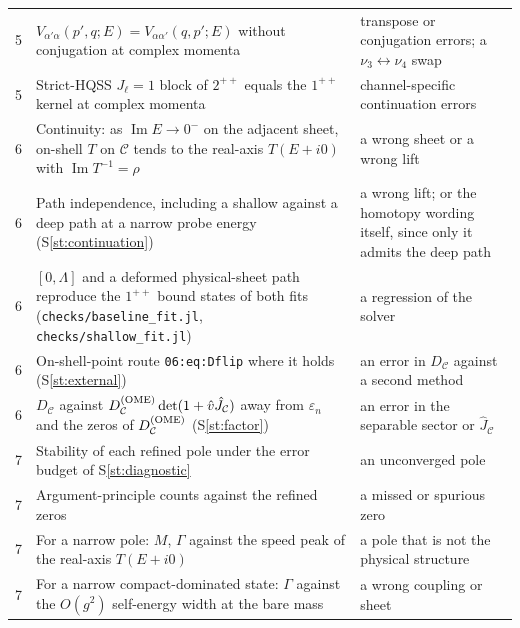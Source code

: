 \documentclass[11pt]{article}
\newcommand{\file}[1]{\nolinkurl{#1}}
\newcommand{\Sr}[1]{S\ref{#1}}
\begin{document}
\begin{xltabular}{\textwidth}{@{}lLL@{}}
5 & $V_{\alpha'\alpha}(p',q;E)=V_{\alpha\alpha'}(q,p';E)$ without conjugation at complex momenta & transpose or conjugation errors; a $\nu_3\leftrightarrow\nu_4$ swap\\
5 & Strict-HQSS $J_\ell=1$ block of $2^{++}$ equals the $1^{++}$ kernel at complex momenta & channel-specific continuation errors\\
6 & Continuity: as $\operatorname{Im}E\to0^-$ on the adjacent sheet, on-shell $T$ on $\mathcal C$ tends to the real-axis $T(E+i0)$ with $\operatorname{Im}T^{-1}=\rho$ & a wrong sheet or a wrong lift\\
6 & Path independence, including a shallow against a deep path at a narrow probe energy (\Sr{st:continuation}) & a wrong lift; or the homotopy wording itself, since only it admits the deep path\\
6 & $[0,\Lambda]$ and a deformed physical-sheet path reproduce the $1^{++}$ bound states of both fits (\file{checks/baseline_fit.jl}, \file{checks/shallow_fit.jl}) & a regression of the solver\\
6 & On-shell-point route \texttt{06:eq:Dflip} where it holds (\Sr{st:external}) & an error in $D_{\mathcal C}$ against a second method\\
6 & $D_{\mathcal C}$ against $D^{\rm(OME)}_{\mathcal C}\det(1+\hat v\hat J_{\mathcal C})$ away from $\varepsilon_n$ and the zeros of $D^{\rm(OME)}_{\mathcal C}$ (\Sr{st:factor}) & an error in the separable sector or $\hat J_{\mathcal C}$\\
7 & Stability of each refined pole under the error budget of \Sr{st:diagnostic} & an unconverged pole\\
7 & Argument-principle counts against the refined zeros & a missed or spurious zero\\
7 & For a narrow pole: $M$, $\Gamma$ against the speed peak of the real-axis $T(E+i0)$ & a pole that is not the physical structure\\
7 & For a narrow compact-dominated state: $\Gamma$ against the $O(g^2)$ self-energy width at the bare mass & a wrong coupling or sheet\\
\bottomrule
\end{xltabular}
\end{document}

